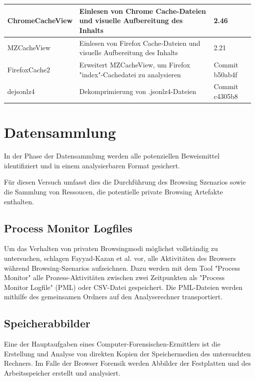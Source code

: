 \begin{table}[]
{\begin{tabular}{|l|l|l|}
ChromeCacheView                         & Einlesen von Chrome Cache-Dateien und visuelle Aufbereitung des Inhalts          & 2.46                                  \\ \hline
MZCacheView                             & Einlesen von Firefox Cache-Dateien und visuelle Aufbereitung des Inhalts         & 2.21                                  \\ \hline
FirefoxCache2                           & Erweitert MZCacheView, um Firefox "index"-Cachedatei zu analysieren              & Commit b50ab4f                        \\ \hline
dejsonlz4                               & Dekomprimierung von .jsonlz4-Dateien                                             & Commit c4305b8                        \\ \hline
\end{tabular}
}
\end{table}


\section{Datensammlung}
\label{section:methodik-datensammlung}
In der Phase der Datensammlung werden alle potenziellen Beweismittel identifiziert und in einem analysierbaren Format gesichert.\cite{Izzati.2022}

Für diesen Versuch umfasst dies die Durchführung des Browsing Szenarios sowie die Sammlung von Ressoucen, die potentielle private Browsing Artefakte enthalten.

\subsection*{Process Monitor Logfiles}
\label{subsection:methodik-datensammlung-processmonitorlogfiles}
Um das Verhalten von privaten Browsingmodi möglichst vollständig zu untersuchen, schlagen Fayyad-Kazan et al. \cite{Fayyad.2021} vor, alle Aktivitäten des Browsers während Browsing-Szenarios aufzeichnen.
Dazu werden mit dem Tool "Process Monitor" alle Prozess-Aktivitäten zwischen zwei Zeitpunkten als "Process Monitor Logfile" (PML) oder CSV-Datei gespeichert. \cite{Fayyad.2021, Rochmadi.2017}
Die PML-Dateien werden mithilfe des gemeinsamen Ordners auf den Analyserechner transportiert.

\subsection*{Speicherabbilder}
\label{subsection:methodik-datensammlung-speicherabbilder}
Eine der Hauptaufgaben eines Computer-Forensischen-Ermittlers ist die Erstellung und Analyse von direkten Kopien der Speichermedien des untersuchten Rechners. \cite{Hassan.2019}
Im Falle der Browser Forensik werden Abbilder der Festplatten und des Arbeitsspeicher erstellt und analysiert.

